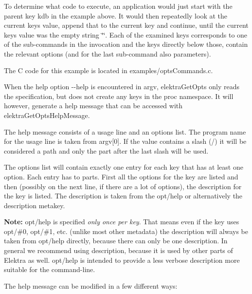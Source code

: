 To determine what code to execute, an application would just start with the parent key {\ttfamily kdb} in the example above. It would then repeatedly look at the current key\textquotesingle{}s value, append that to the current key and continue, until the current key\textquotesingle{}s value was the empty string {\ttfamily \char`\"{}\char`\"{}}. Each of the examined keys corresponds to one of the sub-\/commands in the invocation and the keys directly below those, contain the relevant options (and for the last sub-\/command also parameters).

The C code for this example is located in {\ttfamily examples/opts\+Commands.\+c}.

When the help option {\ttfamily -\/-\/help} is encountered in {\ttfamily argv}, {\ttfamily elektra\+Get\+Opts} only reads the specification, but does not create any keys in the {\ttfamily proc} namespace. It will however, generate a help message that can be accessed with {\ttfamily elektra\+Get\+Opts\+Help\+Message}.

The help message consists of a usage line and an options list. The program name for the usage line is taken from {\ttfamily argv\mbox{[}0\mbox{]}}. If the value contains a slash ({\ttfamily /}) it will be considered a path and only the part after the last slash will be used.

The options list will contain exactly one entry for each key that has at least one option. Each entry has to parts. First all the options for the key are listed and then (possibly on the next line, if there are a lot of options), the description for the key is listed. The description is taken from the {\ttfamily opt/help} or alternatively the {\ttfamily description} metakey.

{\bfseries Note\+:} {\ttfamily opt/help} is specified {\itshape only once per key}. That means even if the key uses {\ttfamily opt/\#0}, {\ttfamily opt/\#1}, etc. (unlike most other metadata) the description will always be taken from {\ttfamily opt/help} directly, because there can only be one description. In general we recommend using {\ttfamily description}, because it is used by other parts of Elektra as well. {\ttfamily opt/help} is intended to provide a less verbose description more suitable for the command-\/line.

The help message can be modified in a few different ways\+:


